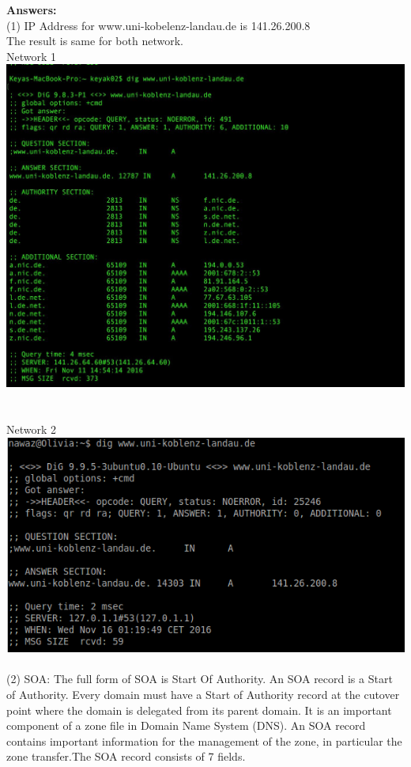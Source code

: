 \documentclass{WeSTassignment}
\begin{document}
\textbf{Answers:}\\
(1) IP Address for www.uni-kobelenz-landau.de is 141.26.200.8 \\
The result is same for both network. \\
Network 1 \\
\includegraphics[width=1\textwidth]{images/net-com1.png} \\ \\ \\
Network 2 \\
\includegraphics[width=1\textwidth]{images/net2-com1.png} \\ \\
(2) SOA: The full form of SOA is Start Of Authority. An SOA record is a Start of Authority. Every domain must have a Start of Authority record at the cutover point where the domain is delegated from its parent domain. It is an important component of a zone file in Domain Name System (DNS). An SOA record contains important information for the management of the zone, in particular the zone transfer.The SOA record consists of 7 fields. \\
\end{document}
